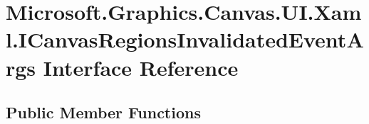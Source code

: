 \hypertarget{interface_microsoft_1_1_graphics_1_1_canvas_1_1_u_i_1_1_xaml_1_1_i_canvas_regions_invalidated_event_args}{}\section{Microsoft.\+Graphics.\+Canvas.\+U\+I.\+Xaml.\+I\+Canvas\+Regions\+Invalidated\+Event\+Args Interface Reference}
\label{interface_microsoft_1_1_graphics_1_1_canvas_1_1_u_i_1_1_xaml_1_1_i_canvas_regions_invalidated_event_args}
\subsection*{Public Member Functions}
